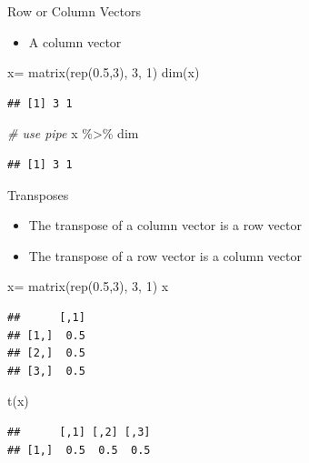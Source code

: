 \documentclass[
  ignorenonframetext,
]{beamer}
\newenvironment{Shaded}{\begin{snugshade}}{\end{snugshade}}
\newcommand{\CommentTok}[1]{\textcolor[rgb]{0.56,0.35,0.01}{\textit{#1}}}
\newcommand{\DecValTok}[1]{\textcolor[rgb]{0.00,0.00,0.81}{#1}}
\newcommand{\FloatTok}[1]{\textcolor[rgb]{0.00,0.00,0.81}{#1}}
\newcommand{\FunctionTok}[1]{\textcolor[rgb]{0.00,0.00,0.00}{#1}}
\newcommand{\NormalTok}[1]{#1}
\newcommand{\OtherTok}[1]{\textcolor[rgb]{0.56,0.35,0.01}{#1}}
\newcommand{\SpecialCharTok}[1]{\textcolor[rgb]{0.00,0.00,0.00}{#1}}
\providecommand{\tightlist}{%
  \setlength{\itemsep}{0pt}\setlength{\parskip}{0pt}}
\begin{document}
\begin{frame}[fragile]{Row or Column Vectors}
\protect\hypertarget{row-or-column-vectors-2}{}
\begin{itemize}
\tightlist
\item
  A column vector
\end{itemize}

\begin{Shaded}
\begin{Highlighting}[]
\NormalTok{x}\OtherTok{=} \FunctionTok{matrix}\NormalTok{(}\FunctionTok{rep}\NormalTok{(}\FloatTok{0.5}\NormalTok{,}\DecValTok{3}\NormalTok{), }\DecValTok{3}\NormalTok{, }\DecValTok{1}\NormalTok{)}
\FunctionTok{dim}\NormalTok{(x)}
\end{Highlighting}
\end{Shaded}

\begin{verbatim}
## [1] 3 1
\end{verbatim}

\begin{Shaded}
\begin{Highlighting}[]
\CommentTok{\# use pipe}
\NormalTok{x }\SpecialCharTok{\%\textgreater{}\%}\NormalTok{ dim}
\end{Highlighting}
\end{Shaded}

\begin{verbatim}
## [1] 3 1
\end{verbatim}
\end{frame}

\begin{frame}[fragile]{Transposes}
\protect\hypertarget{transposes}{}
\begin{itemize}
\tightlist
\item
  The transpose of a column vector is a row vector
\item
  The transpose of a row vector is a column vector
\end{itemize}

\begin{Shaded}
\begin{Highlighting}[]
\NormalTok{x}\OtherTok{=} \FunctionTok{matrix}\NormalTok{(}\FunctionTok{rep}\NormalTok{(}\FloatTok{0.5}\NormalTok{,}\DecValTok{3}\NormalTok{), }\DecValTok{3}\NormalTok{, }\DecValTok{1}\NormalTok{)}
\NormalTok{x}
\end{Highlighting}
\end{Shaded}

\begin{verbatim}
##      [,1]
## [1,]  0.5
## [2,]  0.5
## [3,]  0.5
\end{verbatim}

\begin{Shaded}
\begin{Highlighting}[]
\FunctionTok{t}\NormalTok{(x)}
\end{Highlighting}
\end{Shaded}

\begin{verbatim}
##      [,1] [,2] [,3]
## [1,]  0.5  0.5  0.5
\end{verbatim}
\end{frame}
\end{document}
